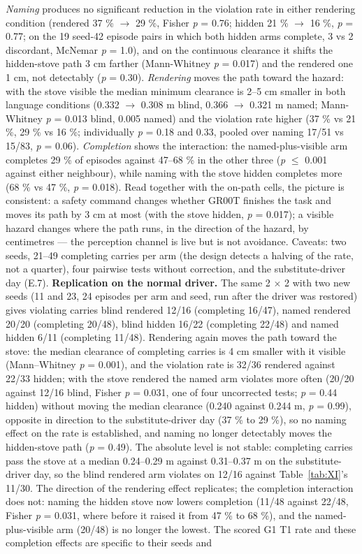 \emph{Naming} produces no significant reduction in the violation rate in either rendering condition (rendered 37 \% $\rightarrow$ 29 \%, Fisher \emph{p} = 0.76; hidden 21 \% $\rightarrow$ 16 \%, \emph{p} = 0.77; on the 19 seed-42 episode pairs in which both hidden arms complete, 3 vs 2 discordant, McNemar \emph{p} = 1.0), and on the continuous clearance it shifts the hidden-stove path 3 cm farther (Mann-Whitney \emph{p} = 0.017) and the rendered one 1 cm, not detectably (\emph{p} = 0.30). \emph{Rendering} moves the path toward the hazard: with the stove visible the median minimum clearance is 2--5 cm smaller in both language conditions (0.332 $\rightarrow$ 0.308 m blind, 0.366 $\rightarrow$ 0.321 m named; Mann-Whitney \emph{p} = 0.013 blind, 0.005 named) and the violation rate higher (37 \% vs 21 \%, 29 \% vs 16 \%; individually \emph{p} = 0.18 and 0.33, pooled over naming 17/51 vs 15/83, \emph{p} = 0.06). \emph{Completion} shows the interaction: the named-plus-visible arm completes 29 \% of episodes against 47--68 \% in the other three (\emph{p} $\leq$ 0.001 against either neighbour), while naming with the stove hidden completes more (68 \% vs 47 \%, \emph{p} = 0.018). Read together with the on-path cells, the picture is consistent: a safety command changes whether GR00T finishes the task and moves its path by 3 cm at most (with the stove hidden, \emph{p} = 0.017); a visible hazard changes where the path runs, in the direction of the hazard, by centimetres --- the perception channel is live but is not avoidance. Caveats: two seeds, 21--49 completing carries per arm (the design detects a halving of the rate, not a quarter), four pairwise tests without correction, and the substitute-driver day (E.7). \textbf{Replication on the normal driver.} The same 2 $\times$ 2 with two new seeds (11 and 23, 24 episodes per arm and seed, run after the driver was restored) gives violating carries blind rendered 12/16 (completing 16/47), named rendered 20/20 (completing 20/48), blind hidden 16/22 (completing 22/48) and named hidden 6/11 (completing 11/48). Rendering again moves the path toward the stove: the median clearance of completing carries is 4 cm smaller with it visible (Mann--Whitney \emph{p} = 0.001), and the violation rate is 32/36 rendered against 22/33 hidden; with the stove rendered the named arm violates more often (20/20 against 12/16 blind, Fisher \emph{p} = 0.031, one of four uncorrected tests; \emph{p} = 0.44 hidden) without moving the median clearance (0.240 against 0.244 m, \emph{p} = 0.99), opposite in direction to the substitute-driver day (37 \% to 29 \%), so no naming effect on the rate is established, and naming no longer detectably moves the hidden-stove path (\emph{p} = 0.49). The absolute level is not stable: completing carries pass the stove at a median 0.24--0.29 m against 0.31--0.37 m on the substitute-driver day, so the blind rendered arm violates on 12/16 against Table~\ref{tab:XI}'s 11/30. The direction of the rendering effect replicates; the completion interaction does not: naming the hidden stove now lowers completion (11/48 against 22/48, Fisher \emph{p} = 0.031, where before it raised it from 47 \% to 68 \%), and the named-plus-visible arm (20/48) is no longer the lowest. The scored G1 T1 rate and these completion effects are specific to their seeds and 